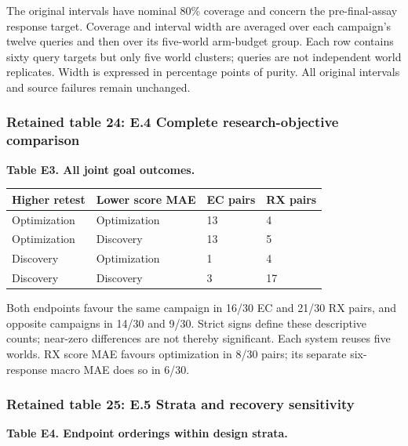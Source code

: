 \documentclass[10pt,a4paper]{article}
\begin{document}
The original intervals have nominal 80\% coverage and concern the pre-final-assay response target. Coverage and interval width are averaged over each campaign's twelve queries and then over its five-world arm-budget group. Each row contains sixty query targets but only five world clusters; queries are not independent world replicates. Width is expressed in percentage points of purity. All original intervals and source failures remain unchanged.

\subsubsection{Retained table 24: E.4 Complete research-objective comparison}\label{retained-table-24-e.4-complete-research-objective-comparison}

\textbf{Table E3. All joint goal outcomes.}

{\def\LTcaptype{table} %
\small\begin{longtable}[]{@{}llll@{}}
\toprule\noalign{}
Higher retest & Lower score MAE & EC pairs & RX pairs \\
\midrule\noalign{}
\endhead
\bottomrule\noalign{}
\endlastfoot
Optimization & Optimization & 13 & 4 \\
Optimization & Discovery & 13 & 5 \\
Discovery & Optimization & 1 & 4 \\
Discovery & Discovery & 3 & 17 \\
\end{longtable}\normalsize
}

Both endpoints favour the same campaign in 16/30 EC and 21/30 RX pairs, and opposite campaigns in 14/30 and 9/30. Strict signs define these descriptive counts; near-zero differences are not thereby significant. Each system reuses five worlds. RX score MAE favours optimization in 8/30 pairs; its separate six-response macro MAE does so in 6/30.

\subsubsection{Retained table 25: E.5 Strata and recovery sensitivity}\label{retained-table-25-e.5-strata-and-recovery-sensitivity}

\textbf{Table E4. Endpoint orderings within design strata.}
\end{document}
